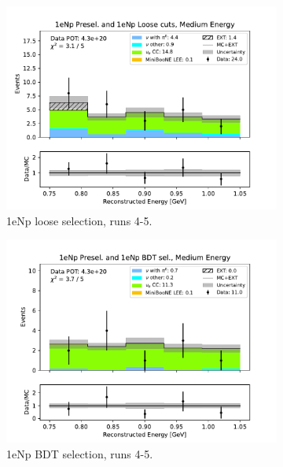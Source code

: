\begin{figure}[H]
\begin{subfigure}{0.33\linewidth}
        \includegraphics[width=\linewidth]{technote/Sidebands/Figures/NearSideband/near_sideband_reco_e_run4b4c4d5_NP_NPL_MEDIUM_ENERGY.pdf}
        \caption{1eNp loose selection, runs 4-5.}
    \end{subfigure}%
    \begin{subfigure}{0.33\linewidth}
        \includegraphics[width=\linewidth]{technote/Sidebands/Figures/NearSideband/near_sideband_reco_e_run4b4c4d5_NP_NPBDT_MEDIUM_ENERGY.pdf}
        \caption{1eNp BDT selection, runs 4-5.}
    \end{subfigure}
    \begin{subfigure}{0.33\linewidth}

\end{subfigure}
\end{figure}
